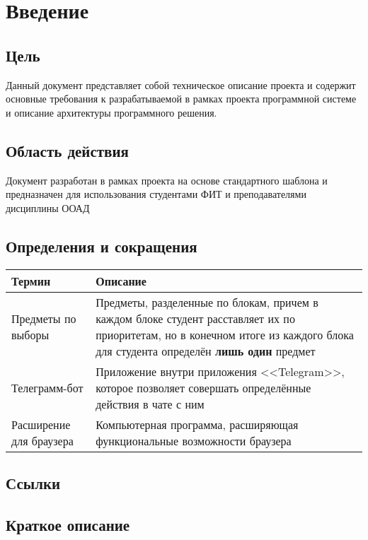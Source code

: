\chapter{Введение}
	\section{Цель}
		Данный документ представляет собой техническое описание проекта \ProjectName и содержит основные требования к разрабатываемой в рамках проекта программной системе и описание архитектуры программного решения.
	\section{Область действия}
		Документ разработан в рамках проекта \ProjectName на основе стандартного шаблона и предназначен для использования студентами ФИТ и преподавателями дисциплины ООАД
	\section{Определения и сокращения}
		\begin{tabularx}{\textwidth}{
				| >{\centering\arraybackslash\hsize=5cm}X
				| >{\centering\arraybackslash}X
				|}\hline
			\textbf{Термин} & \textbf{Описание} \\\hline
			Предметы по выборы & Предметы, разделенные по блокам, причем в каждом блоке студент расставляет их по приоритетам, но в конечном итоге из каждого блока для студента определён \textbf{лишь один} предмет \\\hline
			Телеграмм-бот & Приложение внутри приложения <<Telegram>>, которое позволяет совершать определённые действия в чате с ним \\\hline
			Расширение для браузера & Компьютерная программа, расширяющая функциональные возможности браузера \\\hline
		\end{tabularx}
	\section{Ссылки}

	\section{Краткое описание}
